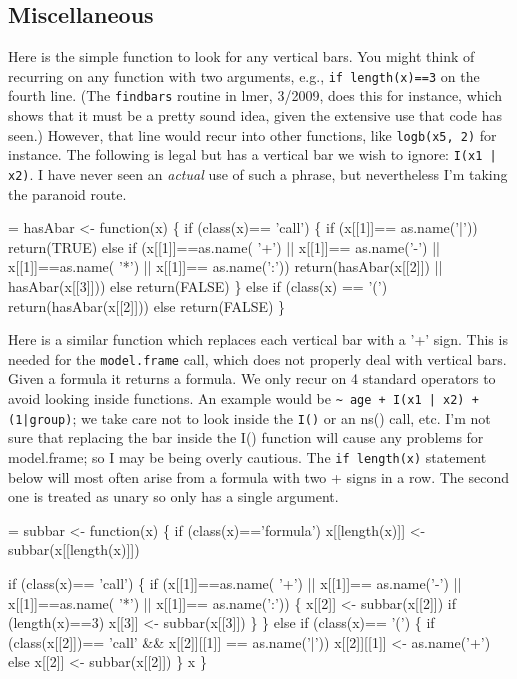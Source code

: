 \documentclass{article}
\begin{document}
\subsection{Miscellaneous}
Here is the simple function to look for any vertical bars.
You might think of recurring on any function with two arguments,
e.g., \Verb!if length(x)==3! on the fourth line.  
(The \Verb!findbars! routine in lmer, 3/2009, does this for instance, which
shows that it must be a pretty sound idea, given the extensive use
that code has seen.)
However, that line would recur into other functions, like \Verb!logb(x5, 2)!
for instance.  
The following is legal but has a vertical bar we wish to
ignore: \Verb!I(x1 | x2)!.
I have never seen an \emph{actual} use of such a phrase,
but nevertheless I'm taking the paranoid  %
route.  

\begin{nwchunk}
=
 hasAbar <- function(x) \{
   if (class(x)== 'call') \{
         if (x[[1]]== as.name('|')) return(TRUE)
         else if (x[[1]]==as.name( '+') || x[[1]]== as.name('-') ||
                  x[[1]]==as.name( '*') || x[[1]]== as.name(':'))
             return(hasAbar(x[[2]]) || hasAbar(x[[3]]))
         else return(FALSE)
         \}
     else if (class(x) == '(') return(hasAbar(x[[2]]))
     else return(FALSE)
     \}
\end{nwchunk}

Here is a similar function which replaces each vertical bar with a '+'
sign.  This is needed for the \Verb!model.frame! call, which does not
properly deal with vertical bars. 
Given a formula it returns a formula.
We only recur on 4 standard operators to avoid looking inside functions. 
An example would be \Verb!~ age + I(x1 | x2) + (1|group)!; we take care not to
look inside the \Verb!I()! or an ns() call, etc.
I'm not sure that replacing the bar inside the I() function will            %
cause any problems for model.frame; so I may be being overly cautious.
The \Verb!if length(x)! statement below will most often arise from a formula 
with two + signs in a row.  The second one is treated as unary so only has
a single argument.
\begin{nwchunk}
=
 subbar <- function(x) \{
     if (class(x)=='formula') x[[length(x)]] <- subbar(x[[length(x)]])
 
     if (class(x)== 'call') \{
         if (x[[1]]==as.name( '+') || x[[1]]== as.name('-') ||
             x[[1]]==as.name( '*') || x[[1]]== as.name(':')) \{
             x[[2]] <- subbar(x[[2]])
             if (length(x)==3) x[[3]] <- subbar(x[[3]])
             \}
         \}
     else if (class(x)== '(') \{
         if (class(x[[2]])== 'call' && x[[2]][[1]] == as.name('|')) 
             x[[2]][[1]] <- as.name('+')
         else x[[2]] <- subbar(x[[2]])
         \}
     x
     \}
    
\end{nwchunk}
    
\end{document}
